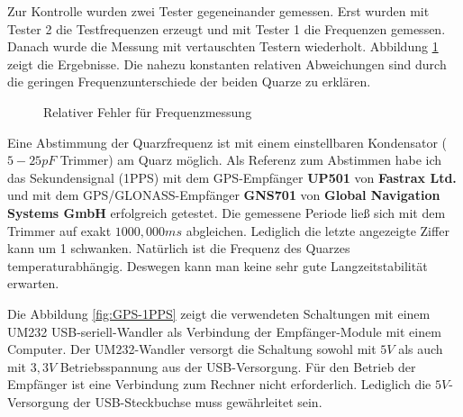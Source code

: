 Zur Kontrolle wurden zwei Tester gegeneinander gemessen.
Erst wurden mit Tester 2 die Testfrequenzen erzeugt und mit Tester 1 die Frequenzen gemessen.
Danach wurde die Messung mit vertauschten Testern wiederholt.
Abbildung \ref{fig:freq-ppm} zeigt die Ergebnisse.
Die nahezu konstanten relativen Abweichungen sind durch die geringen Frequenzunterschiede der beiden Quarze zu erklären.

\begin{figure}[H]
\centering

\caption{Relativer Fehler für Frequenzmessung }
\label{fig:freq-ppm}
\end{figure}

Eine Abstimmung der Quarzfrequenz ist mit einem einstellbaren Kondensator (\(5-25pF\) Trimmer) am Quarz möglich.
Als Referenz zum Abstimmen habe ich das Sekundensignal (1PPS) mit dem GPS-Empfänger {\bf UP501} von {\bf Fastrax Ltd.} und
mit dem GPS/GLONASS-Empfänger {\bf GNS701} von {\bf Global Navigation Systems GmbH} erfolgreich getestet.
Die gemessene Periode ließ sich mit dem Trimmer auf exakt \(1000,000ms\) abgleichen.
Lediglich die letzte angezeigte Ziffer kann um 1 schwanken.
Natürlich ist die Frequenz des Quarzes temperaturabhängig.
Deswegen kann man keine sehr gute Langzeitstabilität erwarten.

Die Abbildung \ref{fig:GPS-1PPS} zeigt die verwendeten Schaltungen mit einem
UM232 USB-seriell-Wandler als Verbindung der Empfänger-Module mit einem Computer.
Der UM232-Wandler versorgt die Schaltung sowohl mit \(5V\) als auch mit \(3,3V\) Betriebsspannung
aus der USB-Versorgung.
Für den Betrieb der Empfänger ist eine Verbindung zum Rechner nicht erforderlich.
Lediglich die \(5V\)-Versorgung der USB-Steckbuchse muss gewährleitet sein.

